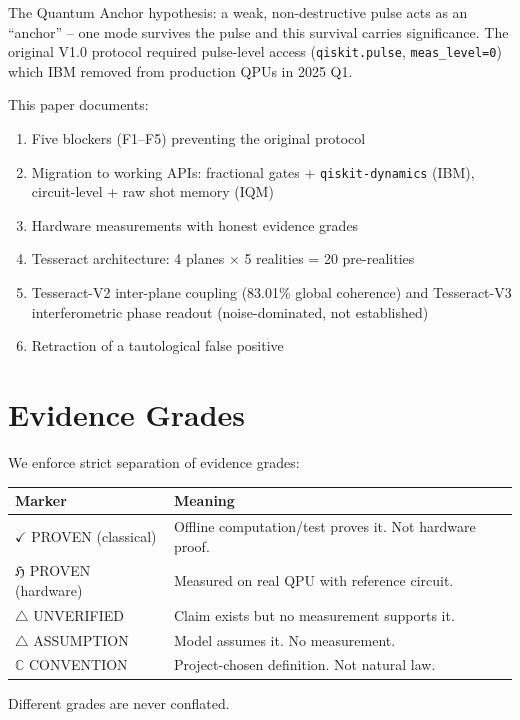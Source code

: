 \documentclass[11pt,a4paper]{article}
\begin{document}
The Quantum Anchor hypothesis: a weak, non-destructive pulse acts as an ``anchor'' -- one mode survives the pulse and this survival carries significance. The original V1.0 protocol required pulse-level access (\texttt{qiskit.pulse}, \texttt{meas\_level=0}) which IBM removed from production QPUs in 2025 Q1.

This paper documents:
\begin{enumerate}
\item Five blockers (F1--F5) preventing the original protocol
\item Migration to working APIs: fractional gates + \texttt{qiskit-dynamics} (IBM), circuit-level + raw shot memory (IQM)
\item Hardware measurements with honest evidence grades
\item Tesseract architecture: 4 planes $\times$ 5 realities = 20 pre-realities
\item Tesseract-V2 inter-plane coupling (83.01\% global coherence) and Tesseract-V3 interferometric phase readout (noise-dominated, not established)
\item Retraction of a tautological false positive
\end{enumerate}

\section{Evidence Grades}

We enforce strict separation of evidence grades:

\begin{table}[h]
\centering
\begin{tabular}{ll}
\toprule
Marker & Meaning \\
\midrule
$\checkmark$ PROVEN (classical) & Offline computation/test proves it. Not hardware proof. \\
$\mathfrak{H}$ PROVEN (hardware) & Measured on real QPU with reference circuit. \\
$\triangle$ UNVERIFIED & Claim exists but no measurement supports it. \\
$\triangle$ ASSUMPTION & Model assumes it. No measurement. \\
$\mathbb{C}$ CONVENTION & Project-chosen definition. Not natural law. \\
\bottomrule
\end{tabular}
\end{table}

Different grades are never conflated.
\end{document}

